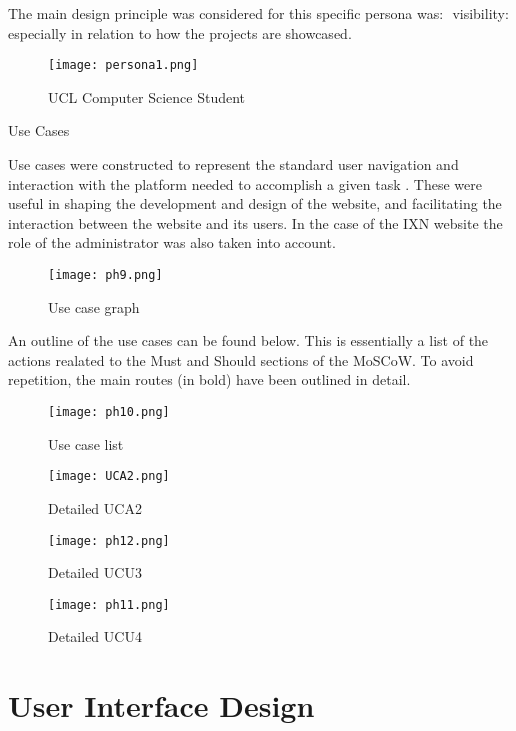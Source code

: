 \documentclass[fontsize=11pt]{extarticle}
\numberwithin{figure}{section} %
\begin{document}
The main design principle was considered for this specific persona was:
​ visibility: especially in relation to how the projects are showcased.
​

\begin{figure}[H]
      \centering
      \texttt{[image: persona1.png]}
      \caption{UCL Computer Science Student}
\end{figure}

Use Cases

Use cases were constructed to represent the standard user navigation and
interaction with the platform needed to accomplish a given task
\cite{g3}. These were useful in shaping the development and design of
the website, and facilitating the interaction between the website and
its users. In the case of the IXN website the role of the administrator
was also taken into account.

\begin{figure}[H]
      \centering
      \texttt{[image: ph9.png]}
      \caption{Use case graph}
\end{figure}

An outline of the use cases can be found below. This is essentially a
list of the actions realated to the Must and Should sections of the
MoSCoW. To avoid repetition, the main routes (in bold) have been
outlined in detail.

\begin{figure}[H]
      \centering
      \texttt{[image: ph10.png]}
      \caption{Use case list}
 \end{figure}

\begin{figure}[H]
      \centering
      \texttt{[image: UCA2.png]}
      \caption{Detailed UCA2}
 \end{figure}

\begin{figure}[H]
      \centering
      \texttt{[image: ph12.png]}
      \caption{Detailed UCU3}
 \end{figure}

\begin{figure}[H]
      \centering
      \texttt{[image: ph11.png]}
      \caption{Detailed UCU4}
 \end{figure}

\hypertarget{user-interface-design}{%
\section{User Interface Design}\label{user-interface-design}}
\end{document}
